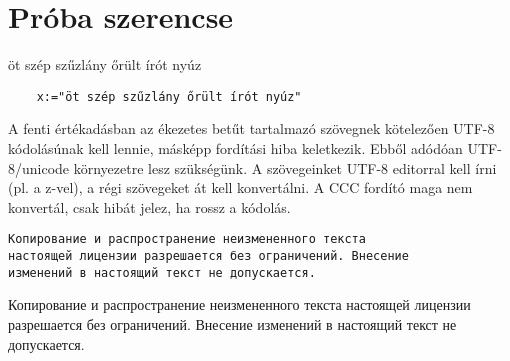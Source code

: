 \documentclass[12pt]{article}
\begin{document}
\tableofcontents

\section{Próba szerencse}

öt szép szűzlány őrült írót nyúz

\begin{verbatim}
    x:="öt szép szűzlány őrült írót nyúz"
\end{verbatim}

A fenti értékadásban az ékezetes betűt tartalmazó szövegnek
kötelezően UTF-8 kódolásúnak kell lennie, másképp fordítási hiba
keletkezik. Ebből adódóan UTF-8/unicode környezetre
lesz szükségünk. A szövegeinket UTF-8 editorral kell írni (pl. a z-vel),
a régi szövegeket át kell konvertálni. A CCC fordító maga nem konvertál,
csak hibát jelez, ha rossz a kódolás. 

\begin{verbatim}
Копирование и распространение неизмененного текста 
настоящей лицензии разрешается без ограничений. Внесение 
изменений в настоящий текст не допускается.
\end{verbatim}

Копирование и распространение неизмененного текста 
настоящей лицензии разрешается без ограничений. Внесение 
изменений в настоящий текст не допускается.
\end{document}
